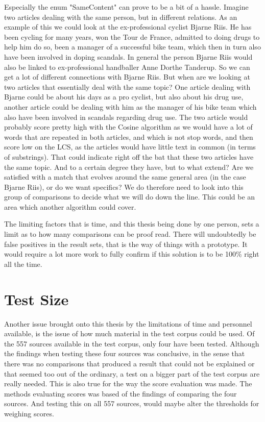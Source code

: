 Especially the enum "SameContent" can prove to be a bit of a hassle. Imagine two articles dealing with the same person, but in different relations. As an example of this we could look at the ex-professional cyclist Bjarne Riis. He has been cycling for many years, won the Tour de France, admitted to doing drugs to help him do so, been a manager of a successful bike team, which then in turn also have been involved in doping scandals. In general the person Bjarne Riis would also be linked to ex-professional handballer Anne Dorthe Tanderup. So we can get a lot of different connections with Bjarne Riis. But when are we looking at two articles that essentially deal with the same topic? One article dealing with Bjarne could be about his days as a pro cyclist, but also about his drug use, another article could be dealing with him as the manager of his bike team which also have been involved in scandals regarding drug use. The two article would probably score pretty high with the Cosine algorithm as we would have a lot of words that are repeated in both articles, and which is not stop words, and then score low on the LCS, as the articles would have little text in common (in terms of substrings). That could indicate right off the bat that these two articles have the same topic. And to a certain degree they have, but to what extend? Are we satisfied with a match that evolves around the same general area (in the case Bjarne Riis), or do we want specifics? We do therefore need to look into this group of comparisons to decide what we will do down the line. This could be an area which another algorithm could cover.

The limiting factors that is time, and this thesis being done by one person, sets a limit as to how many comparisons can be proof read. There will undoubtedly be false positives in the result sets, that is the way of things with a prototype. It would require a lot more work to fully confirm if this solution is to be 100\% right all the time.

\section{Test Size}
Another issue brought onto this thesis by the limitations of time and personnel available, is the issue of how much material in the test corpus could be used. Of the 557 sources available in the test corpus, only four have been tested. Although the findings when testing these four sources was conclusive, in the sense that there was no comparisons that produced a result that could not be explained or that seemed too out of the ordinary, a test on a bigger part of the test corpus are really needed. This is also true for the way the score evaluation was made. The methods evaluating scores was based of the findings of comparing the four sources. And testing this on all 557 sources, would maybe alter the thresholds for weighing scores.

